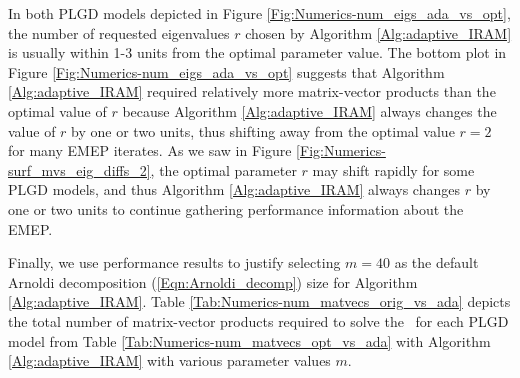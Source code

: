 In both PLGD models depicted in Figure \ref{Fig:Numerics-num_eigs_ada_vs_opt}, the number of requested eigenvalues $r$ chosen by Algorithm \ref{Alg:adaptive_IRAM} is usually within 1-3 units from the optimal parameter value.
The bottom plot in Figure \ref{Fig:Numerics-num_eigs_ada_vs_opt} suggests that Algorithm \ref{Alg:adaptive_IRAM} required relatively more matrix-vector products than the optimal value of $r$ because Algorithm \ref{Alg:adaptive_IRAM} always changes the value of $r$ by one or two units, thus shifting away from the optimal value $r=2$ for many EMEP iterates.
As we saw in Figure \ref{Fig:Numerics-surf_mvs_eig_diffs_2}, the optimal parameter $r$ may shift rapidly for some PLGD models, and thus Algorithm \ref{Alg:adaptive_IRAM} always changes $r$ by one or two units to continue gathering performance information about the EMEP.






Finally, we use performance results to justify selecting $m=40$ as the default Arnoldi decomposition (\ref{Eqn:Arnoldi_decomp}) size for Algorithm \ref{Alg:adaptive_IRAM}.
Table \ref{Tab:Numerics-num_matvecs_orig_vs_ada} depicts the total number of matrix-vector products required to solve the \emep \ for each PLGD model from Table \ref{Tab:Numerics-num_matvecs_opt_vs_ada} with Algorithm \ref{Alg:adaptive_IRAM} with various parameter values $m$.

